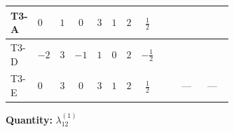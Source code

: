 \documentclass[8pt]{article}
\begin{document}
\begin{landscape}
\begin{longtable}{@{}llcccccc >{\raggedright\arraybackslash}p{0.21\linewidth} >{\raggedright\arraybackslash}p{0.21\linewidth} >{\raggedright\arraybackslash}p{0.21\linewidth}@{}}
\midrule
T3-A & $0$ & $1$ & $0$ & $3$ & $1$ & $2$ & $\frac{1}{2}$ & \scriptsize\adjustbox{max width=\linewidth}{$\begin{gathered} +4 {\lambda_{12}^{(1)}}^2\end{gathered}$} & \scriptsize\adjustbox{max width=\linewidth}{$\begin{gathered} +4 {\lambda_{12}^{(1)}} {\lambda_{S_1}^{(1)}}\end{gathered}$} & \scriptsize\adjustbox{max width=\linewidth}{$\begin{gathered} +8 {\lambda_{12}^{(1)}} {\lambda_{S_2}^{(1)}}\end{gathered}$} \\
\midrule
T3-D & $-2$ & $3$ & $-1$ & $1$ & $0$ & $2$ & $-\frac{1}{2}$ & \scriptsize\adjustbox{max width=\linewidth}{$\begin{gathered} +4 {\lambda_{12}^{(1)}}^2\end{gathered}$} & \scriptsize\adjustbox{max width=\linewidth}{$\begin{gathered} +8 {\lambda_{12}^{(1)}} {\lambda_{S_1}^{(1)}}\end{gathered}$} & \scriptsize\adjustbox{max width=\linewidth}{$\begin{gathered} +4 {\lambda_{12}^{(1)}} {\lambda_{S_2}^{(1)}}\end{gathered}$} \\
\midrule
T3-E & $0$ & $3$ & $0$ & $3$ & $1$ & $2$ & $\frac{1}{2}$ & \scriptsize\adjustbox{max width=\linewidth}{$\begin{gathered} +4 {\lambda_{12}^{(1)}}^2\end{gathered}$} & --- & --- \\
\midrule
\bottomrule
\end{longtable}
\clearpage
\noindent\textbf{Quantity: }$\lambda_{12}^{(1)}$\par\smallskip

\end{landscape}
\end{document}
